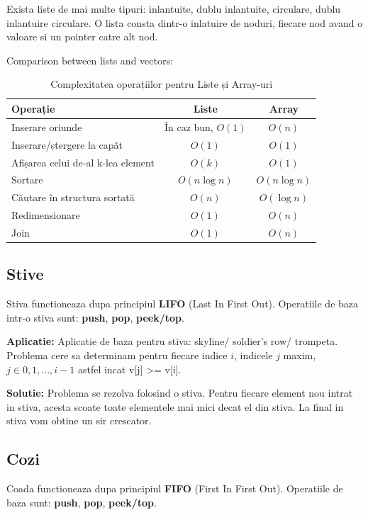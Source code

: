 \documentclass[11pt,a4paper]{article}
\theoremstyle{definition}
\theoremstyle{plain}
\theoremstyle{remark}
\begin{document}
Exista liste de mai multe tipuri: inlantuite, dublu inlantuite, circulare, dublu inlantuire circulare. O lista consta dintr-o inlatuire de noduri, fiecare nod avand o valoare si un pointer catre alt nod.

Comparison between lists and vectors:
\begin{table}[h!]
\centering

\begin{tabular}
{|>{\raggedright\arraybackslash}m{5cm}|c|c|}
\hline
\textbf{Operație} & \textbf{Liste} & \textbf{Array} \\
\hline
Inserare oriunde & În caz bun, \( O(1) \) & \( O(n) \) \\
\hline
Inserare/ștergere la capăt & \( O(1) \) & \( O(1) \) \\
\hline
Afișarea celui de-al k-lea element & \( O(k) \) & \( O(1) \) \\
\hline
Sortare & \( O(n \log n) \) & \( O(n \log n) \) \\
\hline
Căutare în structura sortată & \( O(n) \) & \( O(\log n) \) \\
\hline
Redimensionare & \( O(1) \) & \( O(n) \) \\
\hline
Join & \( O(1) \) & \( O(n) \) \\
\hline
\end{tabular}
\caption{Complexitatea operațiilor pentru Liste și Array-uri}
\end{table}

\subsection{Stive}
Stiva functioneaza dupa principiul \textbf{LIFO} (Last In First Out).
Operatiile de baza intr-o stiva sunt: \textbf{push}, \textbf{pop}, \textbf{peek/top}.

\textbf{Aplicatie:}
Aplicatie de baza pentru stiva: skyline/ soldier's row/ trompeta. Problema cere sa determinam pentru fiecare indice $i$, indicele $j$ maxim, $j \in {0, 1, ..., i-1}$ astfel incat v[j] >= v[i].

\textbf{Solutie:}
Problema se rezolva folosind o stiva. Pentru fiecare element nou intrat in stiva, acesta scoate toate elementele mai mici decat el din stiva. La final in stiva vom obtine un sir crescator.

\subsection{Cozi}
Coada functioneaza dupa principiul \textbf{FIFO} (First In First Out). Operatiile de baza sunt: \textbf{push}, \textbf{pop}, \textbf{peek/top}.
\end{document}
